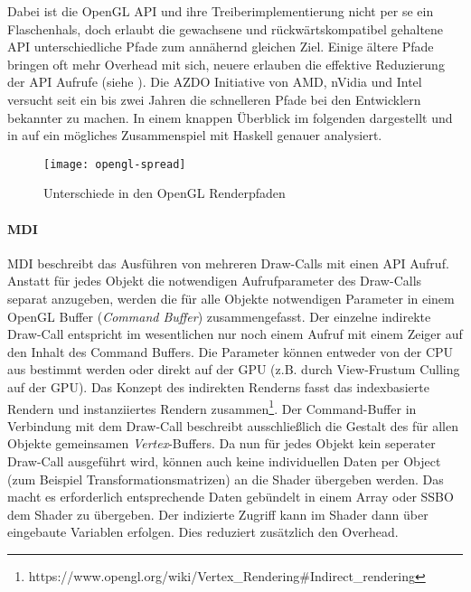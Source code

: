 Dabei ist die OpenGL API und ihre Treiberimplementierung nicht per se ein Flaschenhals, doch erlaubt die gewachsene und rückwärtskompatibel gehaltene API unterschiedliche Pfade zum annähernd gleichen Ziel. Einige ältere Pfade bringen oft mehr Overhead mit sich, neuere erlauben die effektive Reduzierung der API Aufrufe (siehe ).  Die \ac{AZDO} Initiative von AMD, nVidia und Intel versucht seit ein bis zwei Jahren die schnelleren Pfade bei den Entwicklern bekannter zu machen. In einem knappen Überblick im folgenden dargestellt und in  auf ein mögliches Zusammenspiel mit Haskell genauer analysiert.

\begin{figure}
	\texttt{[image: opengl-spread]}
	\caption[Unterschiede in den OpenGL Renderpfaden]{Unterschiede in den OpenGL Renderpfaden \parencite[Seite 98]{Everitt2014}}
	\label{fig:opengl-pfade}
\end{figure}

\paragraph{\acl{MDI}} 
\ac{MDI} beschreibt das Ausführen von mehreren Draw-Calls mit einen API Aufruf. Anstatt für jedes Objekt die notwendigen Aufrufparameter des Draw-Calls separat anzugeben, werden die für alle Objekte notwendigen Parameter in einem OpenGL Buffer (\textit{Command Buffer}) zusammengefasst. Der einzelne indirekte Draw-Call entspricht im wesentlichen nur noch einem Aufruf mit einem Zeiger auf den Inhalt des Command Buffers. Die Parameter können entweder von der CPU aus bestimmt werden oder direkt auf der GPU (z.B. durch View-Frustum Culling auf der GPU). Das Konzept des indirekten Renderns fasst das indexbasierte Rendern und instanziiertes Rendern zusammen\footnote{https://www.opengl.org/wiki/Vertex\_Rendering\#Indirect\_rendering}. Der Command-Buffer in Verbindung mit dem Draw-Call beschreibt ausschließlich die Gestalt des für allen Objekte gemeinsamen \textit{Vertex}-Buffers. Da nun für jedes Objekt kein seperater Draw-Call ausgeführt wird, können auch keine individuellen Daten per Object (zum Beispiel Transformationsmatrizen) an die Shader übergeben werden. Das macht es erforderlich entsprechende Daten gebündelt in einem Array oder \ac{SSBO} dem Shader zu übergeben. Der indizierte Zugriff kann im Shader dann über eingebaute Variablen erfolgen. Dies reduziert zusätzlich den Overhead.

